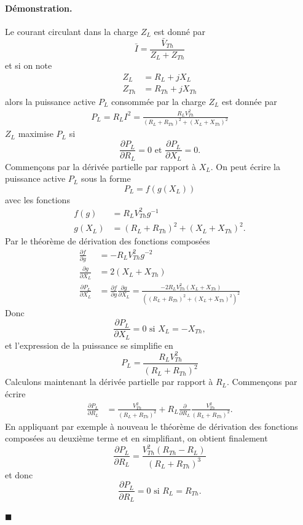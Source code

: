 \paragraph{Démonstration.} Le courant circulant dans la charge $Z_L$ est donné par
$$ \bar{I}=\frac{\bar{V}_{Th}}{Z_L+Z_{Th}} $$
et si on note 
\begin{align*}
Z_L &= R_L + j X_L \\
Z_{Th}&=R_{Th}+jX_{Th}
\end{align*} alors la puissance active $P_L$ consommée par la charge $Z_L$ est donnée par
\begin{align*}
P_L=R_L I^2=\frac{R_L V_{Th}^2}{(R_L+R_{Th})^2+(X_L+X_{Th})^2}
\end{align*}		
$Z_L$ maximise $P_L$ si 
$$\frac{\partial P_L}{\partial R_L}=0 \text { et } \frac{\partial P_L}{\partial X_L}=0.$$
Commençons par la dérivée partielle par rapport à $X_L$.
On peut écrire la puissance active $P_L$ sous la forme $$P_L = f(g(X_L))$$ avec les fonctions
\begin{align*}
f(g)&=R_L V_{Th}^2 g^{-1} \\
g(X_L)& = (R_L+R_{Th})^2+(X_L+X_{Th})^2.
\end{align*}
Par le théorème de dérivation des fonctions composées
\begin{align*}
\frac{\partial f}{\partial g} &= -R_L V_{Th}^2 g^{-2} \\
\frac{\partial g}{\partial X_L}& = 2(X_L+X_{Th}) \\
\frac{\partial P_L}{\partial X_L}&= \frac{\partial f}{\partial g}\frac{\partial g}{\partial X_L} =  \frac{-2 R_L V_{Th}^2 (X_L+X_{Th})}{\left((R_L+R_{Th})^2+(X_L+X_{Th})^2\right)^2}
\end{align*}
Donc $$\frac{\partial P_L}{\partial X_L}=0 \text{ si  } X_L=-X_{Th},$$ et l'expression de la puissance se simplifie en 
$$P_L=\frac{R_L V_{Th}^2}{(R_L+R_{Th})^2}$$
Calculons maintenant la dérivée partielle par rapport à $R_L$. Commençons par écrire
\begin{align*}
	\frac{\partial P_L}{\partial R_L}& = \frac{V_{Th}^2}{(R_L+R_{Th})^2} + R_L \frac{\partial}{\partial R_L} \frac{V_{Th}^2}{(R_L+R_{Th})^2}.
\end{align*} 
En appliquant par exemple à nouveau le théorème de dérivation des fonctions composées au deuxième terme et en simplifiant, on obtient finalement
$$\frac{\partial P_L}{\partial R_L}=\frac{V_{Th}^2(R_{Th}-R_L)}{(R_L+R_{Th})^3} $$
et donc $$\frac{\partial P_L}{\partial R_L} =0 \text{ si } R_L=R_{Th}.$$
\begin{flushright}
$\blacksquare$
\end{flushright}

